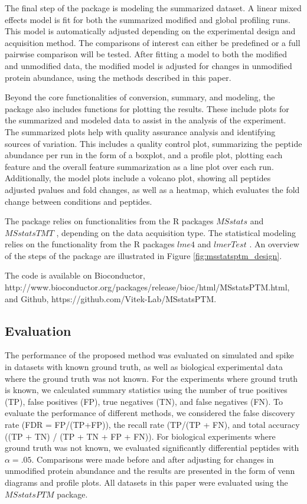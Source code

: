 \documentclass[mcp]{article}
\numberwithin{figure}{section} %
\numberwithin{table}{section}
\begin{document}
The final step of the package is modeling the summarized dataset. A linear mixed effects model is fit for both the summarized modified and global profiling runs. This model is automatically adjusted depending on the experimental design and acquisition method. The comparisons of interest can either be predefined or a full pairwise comparison will be tested. After fitting a model to both the modified and unmodified data, the modified model is adjusted for changes in unmodified protein abundance, using the methods described in this paper. 

Beyond the core functionalities of conversion, summary, and modeling, the package also includes functions for plotting the results. These include plots for the summarized and modeled data to assist in the analysis of the experiment. The summarized plots help with quality assurance analysis and identifying sources of variation. This includes a quality control plot, summarizing the peptide abundance per run in the form of a boxplot, and a profile plot, plotting each feature and the overall feature summarization as a line plot over each run. Additionally, the model plots include a volcano plot, showing all peptides adjusted pvalues and fold changes, as well as a heatmap, which evaluates the fold change between conditions and peptides. 

The package relies on functionalities from the R packages $MSstats$ \cite{Choi:2014} and $MSstatsTMT$ \cite{Huang:2020}, depending on the data acquisition type. The statistical modeling relies on the functionality from the R packages $lme4$ \cite{Bates2015} and $lmerTest$ \cite{Kuznetsova2017}. An overview of the steps of the package are illustrated in Figure \ref{fig:msstatsptm_design}.

The code is available on Bioconductor, http://www.bioconductor.org/packages/release/bioc/html/MSstatsPTM.html, and Github, https://github.com/Vitek-Lab/MSstatsPTM.

\subsection*{Evaluation}

The performance of the proposed method was evaluated on simulated and spike in datasets with known ground truth, as well as biological experimental data where the ground truth was not known. For the experiments where ground truth is known, we calculated summary statistics using the number of true positives (TP), false positives (FP), true negatives (TN), and false negatives (FN). To evaluate the performance of different methods, we considered the false discovery rate (FDR = FP/(TP+FP)), the recall rate (TP/(TP + FN), and total accuracy ((TP + TN) / (TP + TN + FP + FN)). For biological experiments where ground truth was not known, we evaluated significantly differential peptides with $\alpha=.05$. Comparisons were made before and after adjusting for changes in unmodified protein abundance and the results are presented in the form of venn diagrams and profile plots. All datasets in this paper were evaluated using the $MSstatsPTM$ package.
\end{document}
